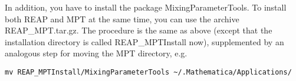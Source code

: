 In addition, you have to install the package MixingParameterTools.
To install both REAP and MPT at the same time, you can use the archive
REAP\_MPT.tar.gz.  The procedure is the same as above (except that the 
installation directory is called REAP\_MPTInstall now), supplemented by
an analogous step for moving the MPT directory, e.g.
\begin{verbatim}
mv REAP_MPTInstall/MixingParameterTools ~/.Mathematica/Applications/
\end{verbatim}


\endinput
